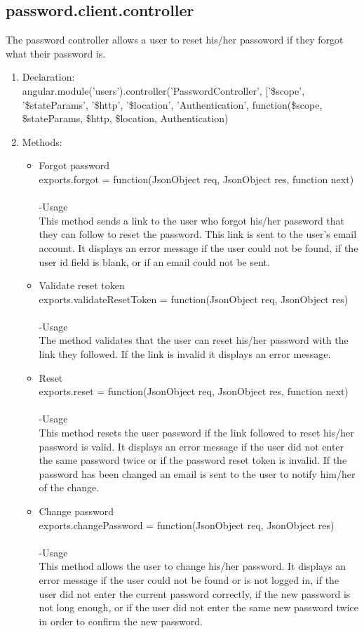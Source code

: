 \documentclass[a4paper,12pt]{report}
\begin{document}
 \subsection{password.client.controller}
 The password controller allows a user to reset his/her passoword if they forgot what their password is. 
 \begin{enumerate}
 \item Declaration:\\angular.module('users').controller('PasswordController', ['\$scope', '\$stateParams', '\$http', '\$location', 'Authentication',
	function(\$scope, \$stateParams, \$http, \$location, Authentication) 
	\item Methods:
	\begin{itemize}
	\item Forgot password\\ 
 exports.forgot = function(JsonObject req, JsonObject res, function next)\\ \\
 -Usage\\
 This method sends a link to the user who forgot his/her password that they can follow to reset the password. This link is sent to the user's email account. It displays an error message if the user could not be found, if the user id field is blank, or if an email could not be sent.
 \item Validate reset token\\
 exports.validateResetToken = function(JsonObject req, JsonObject res)\\ \\
 -Usage\\
 The method validates that the user can reset his/her password with the link they followed. If the link is invalid it displays an error message.\\
 \item Reset\\
 exports.reset = function(JsonObject req, JsonObject res, function next)\\ \\
 -Usage\\
 This method resets the user password if the link followed to reset his/her password is valid. It displays an error message if the user did not enter the same password twice or if the password reset token is invalid. If the password has been changed an email is sent to the user to notify him/her of the change.
 \item Change password\\
 exports.changePassword = function(JsonObject req, JsonObject res)\\  \\
 -Usage\\
 This method allows the user to change his/her password. It displays an error message if the user could not be found or is not logged in, if the user did not enter the current password correctly, if the new password is not long enough, or if the user did not enter the same new password twice in order to confirm the new password.
	\end{itemize}
 \end{enumerate}
\end{document}
